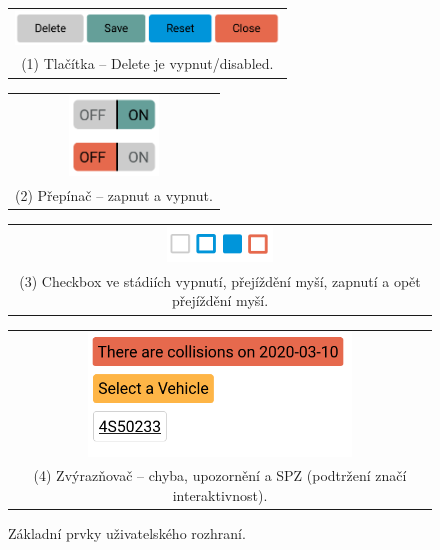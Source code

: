 \begin{figure}[htb!]
  \centering
  \begin{tabular}{@{}c@{}}
    \includegraphics[width=70mm]{../img/buttons.png} \\
    \small (1) Tlačítka -- Delete je vypnut/disabled.
  \end{tabular}

  \vspace{\floatsep}

  \begin{tabular}{@{}c@{}}
    \includegraphics[width=24mm]{../img/two_pickers.png} \\
    \small (2) Přepínač -- zapnut a vypnut.
  \end{tabular}

  \vspace{\floatsep}
  \begin{tabular}{@{}c@{}}
    \includegraphics[width=28mm]{../img/checkboxes.png} \\
    \small (3) Checkbox ve stádiích vypnutí, přejíždění myší, zapnutí a opět přejíždění myší.
  \end{tabular}

  \vspace{\floatsep}
  \begin{tabular}{@{}c@{}}
    \includegraphics[width=70mm]{../img/ui_flag.png} \\
    \small (4) Zvýrazňovač -- chyba, upozornění a SPZ (podtržení značí interaktivnost).
  \end{tabular}
  \caption{Základní prvky uživatelského rozhraní.}
  \label{fig:ui_elems}
\end{figure}


